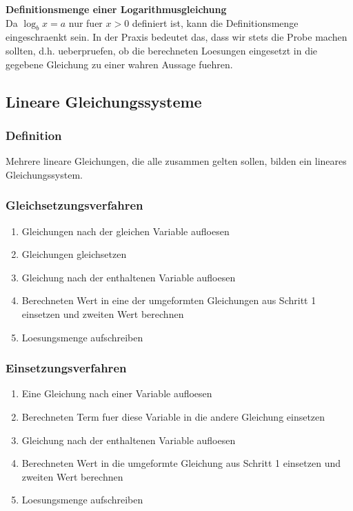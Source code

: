 \begin{multicols}{2}
    \textbf{Definitionsmenge einer Logarithmusgleichung }\\
    Da $\log_{b}x = a$  nur fuer $x > 0$ definiert ist, kann die Definitionsmenge eingeschraenkt sein.
    In der Praxis bedeutet das, dass wir stets die Probe machen sollten, d.h. ueberpruefen, ob die berechneten Loesungen eingesetzt in die gegebene Gleichung zu einer wahren Aussage fuehren.


    \subsection{Lineare Gleichungssysteme}
    \vspace{-4mm}
    \subsubsection{Definition}
    \vspace{-4mm}
    Mehrere lineare Gleichungen, die alle zusammen gelten sollen, bilden ein lineares Gleichungssystem.\\
    \subsubsection{Gleichsetzungsverfahren}
    \vspace{-4mm}
    \begin{enumerate}
        \item Gleichungen nach der gleichen Variable aufloesen
        \item Gleichungen gleichsetzen
        \item Gleichung nach der enthaltenen Variable aufloesen
        \item Berechneten Wert in eine der umgeformten Gleichungen aus Schritt 1 einsetzen und zweiten Wert berechnen
        \item Loesungsmenge aufschreiben
    \end{enumerate}

    \subsubsection{Einsetzungsverfahren}
    \vspace{-4mm}
    \begin{enumerate}
        \item     Eine Gleichung nach einer Variable aufloesen
        \item     Berechneten Term fuer diese Variable in die andere Gleichung einsetzen
        \item     Gleichung nach der enthaltenen Variable aufloesen
        \item     Berechneten Wert in die umgeformte Gleichung aus Schritt 1 einsetzen und zweiten Wert berechnen
        \item     Loesungsmenge aufschreiben
    \end{enumerate}


\end{multicols}
